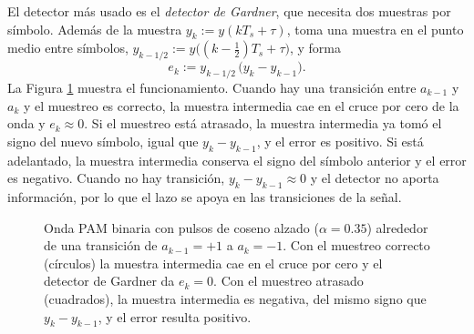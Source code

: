 El detector más usado es el \emph{detector de Gardner}, que necesita dos muestras por símbolo. Además de la muestra $y_k:=y(kT_s+\tau)$, toma una muestra en el punto medio entre símbolos, $y_{k-1/2}:=y\big((k-\tfrac12)T_s+\tau\big)$, y forma
\begin{equation}\label{eq:error gardner}
    e_k := y_{k-1/2}\,\big(y_k - y_{k-1}\big).
\end{equation}
La Figura \ref{fig:gardner onda} muestra el funcionamiento. Cuando hay una transición entre $a_{k-1}$ y $a_k$ y el muestreo es correcto, la muestra intermedia cae en el cruce por cero de la onda y $e_k\approx 0$. Si el muestreo está atrasado, la muestra intermedia ya tomó el signo del nuevo símbolo, igual que $y_k-y_{k-1}$, y el error es positivo. Si está adelantado, la muestra intermedia conserva el signo del símbolo anterior y el error es negativo. Cuando no hay transición, $y_k-y_{k-1}\approx 0$ y el detector no aporta información, por lo que el lazo se apoya en las transiciones de la señal.

\begin{figure}
    \begin{center}
    \end{center}
    \caption{Onda PAM binaria con pulsos de coseno alzado ($\alpha=0.35$) alrededor de una transición de $a_{k-1}=+1$ a $a_k=-1$. Con el muestreo correcto (círculos) la muestra intermedia cae en el cruce por cero y el detector de Gardner da $e_k=0$. Con el muestreo atrasado (cuadrados), la muestra intermedia es negativa, del mismo signo que $y_k-y_{k-1}$, y el error resulta positivo.}\label{fig:gardner onda}
\end{figure}

